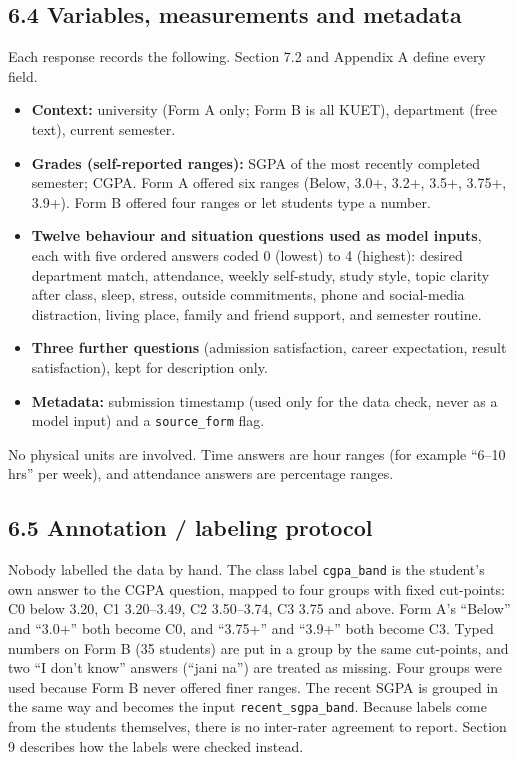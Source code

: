 \documentclass[11pt,a4paper]{article}
\begin{document}
\subsection{6.4 Variables, measurements and metadata}
Each response records the following. Section 7.2 and Appendix A define every field.
\begin{itemize}
\item \textbf{Context:} university (Form A only; Form B is all KUET), department (free text), current semester.
\item \textbf{Grades (self-reported ranges):} SGPA of the most recently completed semester; CGPA. Form A offered six ranges (Below, 3.0+, 3.2+, 3.5+, 3.75+, 3.9+). Form B offered four ranges or let students type a number.
\item \textbf{Twelve behaviour and situation questions used as model inputs}, each with five ordered answers coded 0 (lowest) to 4 (highest): desired department match, attendance, weekly self-study, study style, topic clarity after class, sleep, stress, outside commitments, phone and social-media distraction, living place, family and friend support, and semester routine.
\item \textbf{Three further questions} (admission satisfaction, career expectation, result satisfaction), kept for description only.
\item \textbf{Metadata:} submission timestamp (used only for the data check, never as a model input) and a \texttt{source\_form} flag.
\end{itemize}
No physical units are involved. Time answers are hour ranges (for example ``6--10 hrs'' per week), and attendance answers are percentage ranges.

\subsection{6.5 Annotation / labeling protocol}
Nobody labelled the data by hand. The class label \texttt{cgpa\_band} is the student's own answer to the CGPA question, mapped to four groups with fixed cut-points: C0 below 3.20, C1 3.20--3.49, C2 3.50--3.74, C3 3.75 and above. Form A's ``Below'' and ``3.0+'' both become C0, and ``3.75+'' and ``3.9+'' both become C3. Typed numbers on Form B (35 students) are put in a group by the same cut-points, and two ``I don't know'' answers (``jani na'') are treated as missing. Four groups were used because Form B never offered finer ranges. The recent SGPA is grouped in the same way and becomes the input \texttt{recent\_sgpa\_band}. Because labels come from the students themselves, there is no inter-rater agreement to report. Section 9 describes how the labels were checked instead.
\end{document}

